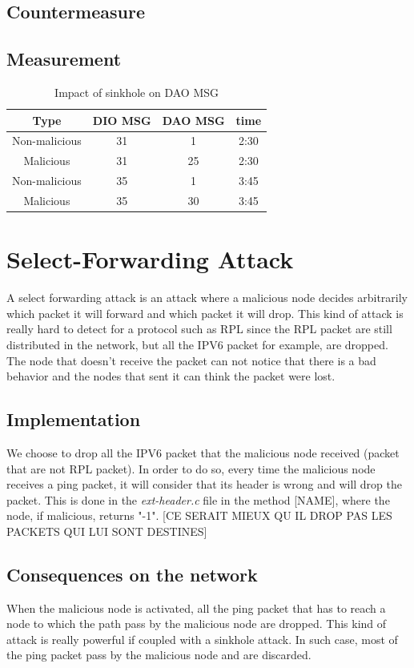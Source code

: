 \documentclass{report}
\begin{document}
\subsection*{Countermeasure}

\subsection*{Measurement}
\begin{table}[h!]
	\centering
	\caption{Impact of  sinkhole on DAO MSG}
	\begin{tabular}{cccc}
		\toprule
		Type&DIO MSG & DAO MSG&time\\
		\midrule
		Non-malicious&31&1&2:30\\
		Malicious&31&25&2:30\\
		Non-malicious&35&1&3:45\\%
		Malicious&35&30&3:45\\
		\bottomrule
	\end{tabular}
\end{table}
\section{Select-Forwarding Attack}
A select forwarding attack is an attack where a malicious node decides arbitrarily which packet it will forward and which packet it will drop. This kind of attack is really hard to detect for a protocol such as RPL since the RPL packet are still distributed in the network, but all the IPV6 packet for example, are dropped. The node that doesn't receive the packet can not notice that there is a bad behavior and the nodes that sent it can think the packet were lost. 
\subsection*{Implementation}
We choose to drop all the IPV6 packet that the malicious node received (packet that are not RPL packet). In order to do so, every time the malicious node receives a ping packet, it will consider that its header is wrong and will drop the packet. This is done in the \textit{ext-header.c} file in the method [NAME], where the node, if malicious, returns "-1".  [CE SERAIT MIEUX QU IL DROP PAS LES PACKETS QUI LUI SONT DESTINES]
\subsection*{Consequences on the network}
When the malicious node is activated, all the ping packet that has to reach a node to which the path pass by the malicious node are dropped. This kind of attack is really powerful if coupled with a sinkhole attack. In such case, most of the ping packet pass by the malicious node and are discarded. 
\end{document}
